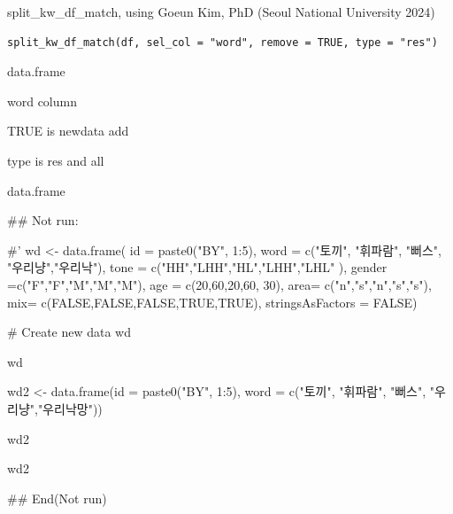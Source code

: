 \documentclass[a4paper]{book}
\begin{document}
%
\begin{Description}
split\_kw\_df\_match, using Goeun Kim, PhD (Seoul National University 2024)
\end{Description}
%
\begin{Usage}
\begin{verbatim}
split_kw_df_match(df, sel_col = "word", remove = TRUE, type = "res")
\end{verbatim}
\end{Usage}
%
\begin{Arguments}
\begin{ldescription}
\item[\code{df}] data.frame

\item[\code{sel\_col}] word column

\item[\code{remove}] TRUE is newdata add

\item[\code{type}] type is res and all
\end{ldescription}
\end{Arguments}
%
\begin{Value}
data.frame
\end{Value}
%
\begin{Examples}
\begin{ExampleCode}

\#\# Not run: 

#' wd <- data.frame(
id =  paste0("BY", 1:5),
word = c("토끼", "휘파람", "뻐스", "우리냥","우리낙"),
tone = c("HH","LHH","HL","LHH","LHL" ),
gender =c("F","F","M","M","M"),
age = c(20,60,20,60, 30),
area= c("n","s","n","s","s"),
mix= c(FALSE,FALSE,FALSE,TRUE,TRUE),
stringsAsFactors = FALSE)

# Create new data
wd%

wd%

wd2 <- data.frame(id =  paste0("BY", 1:5),
word = c("토끼", "휘파람", "뻐스", "우리냥","우리낙망"))

wd2%

wd2%



## End(Not run)



\end{ExampleCode}
\end{Examples}
\end{document}
